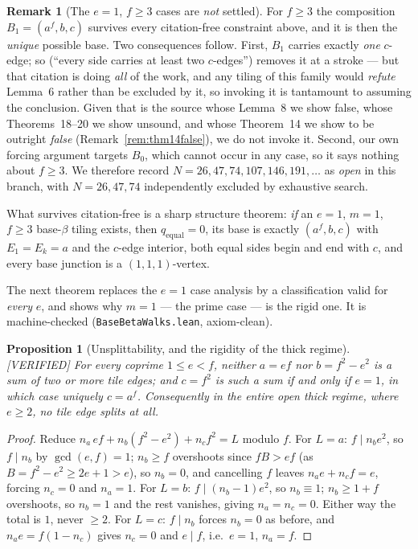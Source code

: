 \documentclass[11pt,reqno]{amsart}
\theoremstyle{plain}
\newtheorem{proposition}[theorem]{Proposition}
\theoremstyle{definition}
\newtheorem{remark}[theorem]{Remark}
\newcommand{\lab}[1]{\hfill\textnormal{\footnotesize\textsc{[#1]}}}
\begin{document}
\begin{remark}[The $e=1$, $f\ge3$ cases are \emph{not} settled]\label{rem:lem6}
For $f\ge3$ the composition $B_1=(a^{f},b,c)$ survives every citation-free constraint above, and it is
then the \emph{unique} possible base. Two consequences follow. First, $B_1$ carries exactly \emph{one} $c$-edge; so \cite[Lem.~6]{BeesonIII} (``every side
carries at least two $c$-edges'') removes it at a stroke --- but that citation is doing \emph{all} of
the work, and any tiling of this family would \emph{refute} Lemma~6 rather than be excluded by it, so
invoking it is tantamount to assuming the conclusion. Given that \cite{BeesonIII} is the source whose
Lemma~8 we show false, whose Theorems~18--20 we show unsound, and whose Theorem~14 we show to be
outright \emph{false} (Remark~\ref{rem:thm14false}), we do not invoke it. Second, our own forcing
argument targets $B_0$, which cannot occur in any case, so it says nothing about $f\ge3$. We
therefore record $N=26,47,74,107,146,191,\dots$ as \emph{open} in this branch, with $N=26,47,74$
independently excluded by exhaustive search.

What survives citation-free is a sharp structure theorem: \emph{if} an $e=1$, $m=1$, $f\ge3$
base-$\beta$ tiling exists, then $q_{\mathrm{equal}}=0$, its base is exactly $(a^{f},b,c)$ with
$E_1=E_k=a$ and the $c$-edge interior, both equal sides begin and end with $c$, and every base
junction is a $(1,1,1)$-vertex.
\end{remark}

The next theorem replaces the $e=1$ case analysis by a classification valid for \emph{every} $e$, and
shows why $m=1$ --- the prime case --- is the rigid one. It is machine-checked
(\texttt{BaseBetaWalks.lean}, axiom-clean).







\begin{proposition}[Unsplittability, and the rigidity of the thick regime]\label{prop:unsplit}\lab{VERIFIED}
For every coprime $1\le e<f$, neither $a=ef$ nor $b=f^2-e^2$ is a sum of two or more tile edges; and
$c=f^2$ is such a sum if and only if $e=1$, in which case uniquely $c=a^{f}$. Consequently \emph{in the
entire open thick regime, where $e\ge2$, no tile edge splits at all}.
\end{proposition}

\begin{proof}
Reduce $n_a\,ef+n_b(f^2-e^2)+n_c f^2=L$ modulo $f$. For $L=a$: $f\mid n_b e^2$, so $f\mid n_b$ by
$\gcd(e,f)=1$; $n_b\ge f$ overshoots since $fB>ef$ (as $B=f^2-e^2\ge2e+1>e$), so $n_b=0$, and
cancelling $f$ leaves $n_a e+n_c f=e$, forcing $n_c=0$ and $n_a=1$. For $L=b$: $f\mid(n_b-1)e^2$, so
$n_b\equiv1$; $n_b\ge1+f$ overshoots, so $n_b=1$ and the rest vanishes, giving $n_a=n_c=0$. Either way
the total is $1$, never $\ge2$. For $L=c$: $f\mid n_b$ forces $n_b=0$ as before, and $n_a e=f(1-n_c)$
gives $n_c=0$ and $e\mid f$, i.e.\ $e=1$, $n_a=f$.
\end{proof}
\end{document}
